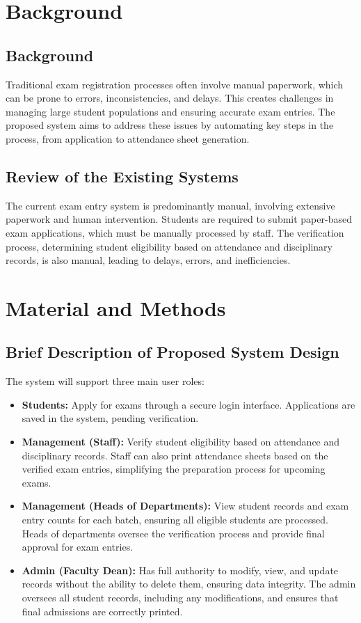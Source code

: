 \documentclass[12pt]{article}
\begin{document}
\newpage

\section{Background}
\justifying
\subsection{Background}
Traditional exam registration processes often involve manual paperwork, which can be prone to errors, inconsistencies, and delays. This creates challenges in managing large student populations and ensuring accurate exam entries. The proposed system aims to address these issues by automating key steps in the process, from application to attendance sheet generation.

\subsection{Review of the Existing Systems}
The current exam entry system is predominantly manual, involving extensive paperwork and human intervention. Students are required to submit paper-based exam applications, which must be manually processed by staff. The verification process, determining student eligibility based on attendance and disciplinary records, is also manual, leading to delays, errors, and inefficiencies.

\newpage

\section{Material and Methods}
\justifying
\subsection{Brief Description of Proposed System Design}
The system will support three main user roles:
\begin{itemize}
    \item \textbf{Students:} Apply for exams through a secure login interface. Applications are saved in the system, pending verification.
    \item \textbf{Management (Staff):} Verify student eligibility based on attendance and disciplinary records. Staff can also print attendance sheets based on the verified exam entries, simplifying the preparation process for upcoming exams.
    \item \textbf{Management (Heads of Departments):} View student records and exam entry counts for each batch, ensuring all eligible students are processed. Heads of departments oversee the verification process and provide final approval for exam entries.
    \item \textbf{Admin (Faculty Dean):} Has full authority to modify, view, and update records without the ability to delete them, ensuring data integrity. The admin oversees all student records, including any modifications, and ensures that final admissions are correctly printed.
\end{itemize}
\end{document}
